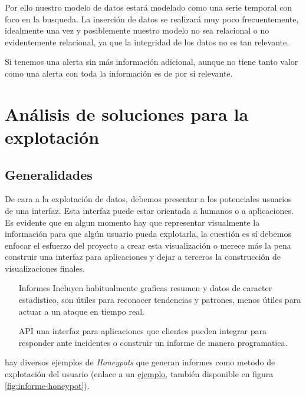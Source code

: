 Por ello nuestro modelo de datos estará modelado como una serie temporal con foco en la busqueda. La inserción de datos se realizará muy poco frecuentemente, idealmente una vez
y posiblemente nuestro modelo no sea relacional o no evidentemente relacional, ya que la integridad de los datos no es tan relevante.

Si tenemos una alerta sin más información adicional, aunque no tiene tanto valor como una alerta con toda la información es de por si relevante.

\section{Análisis de soluciones para la explotación}

\subsection{Generalidades}

De cara a la explotación de datos, debemos presentar a los potenciales usuarios de una interfaz. Esta interfaz puede estar
orientada a humanos o a aplicaciones. Es evidente que en algun momento hay que representar visualmente la información para que algún usuario pueda explotarla,
la cuestión es sí debemos enfocar el esfuerzo del proyecto a crear esta visualización o merece más la pena construir
una interfaz para aplicaciones y dejar a terceros la construcción de visualizaciones finales.

\begin{enumerate}
    \item[Informes] Incluyen habitualmente graficas resumen y datos de caracter estadistico, son útiles para reconocer tendencias y patrones, menos útiles para actuar a un ataque en tiempo real.
    \item[API] una interfaz para aplicaciones que clientes pueden integrar para responder ante incidentes o construir un informe de manera programatica.
\end{enumerate}

hay diversos ejemplos de \emph{Honeypots} que generan informes como metodo de explotación del usuario (enlace a un \href{http://www.nothink.org/honeypot_ssh.php}{ejemplo}, también disponible en figura \ref{fig:informe-honeypot}).

